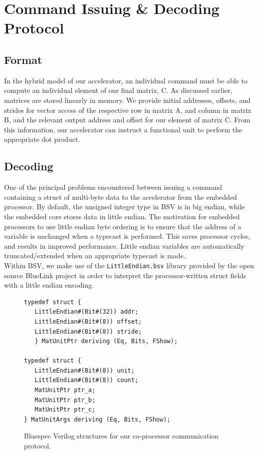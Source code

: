 \documentclass[a4paper,8pt]{report}
\begin{document}
\section{Command Issuing \& Decoding Protocol}
\subsection{Format}
In the hybrid model of our accelerator, an individual command must be able to
compute an individual element of our final matrix, C. As discussed earlier,
matrices are stored linearly in memory. We provide initial addresses, offsets,
and strides for vector access of the respective row in matrix A, and column in
matrix B, and the relevant output address and offset for our element of matrix
C. From this information, our accelerator can instruct a functional unit to
perform the appropriate dot product.

\subsection{Decoding}
One of the principal problems encountered between issuing a command containing
a struct of multi-byte data to the accelerator from the embedded processor. By
default, the unsigned integer type in BSV is in big endian, while the
embedded core stores data in little endian. The motivation for embedded
processors to use little endian byte ordering is to ensure that the address of a
variable is unchanged when a typecast is performed. This saves processor cycles,
and results in improved performance. Little endian variables are automatically
truncated/extended when an appropriate typecast is made. \\


Within BSV, we make use of the \texttt{LittleEndian.bsv} library provided by the
open source BlueLink project in order to interpret the processor-written struct
fields with a little endian encoding.

\begin{figure}[h]
\centering 
\scriptsize
\begin{BVerbatim}
typedef struct {
   LittleEndian#(Bit#(32)) addr;
   LittleEndian#(Bit#(8)) offset;
   LittleEndian#(Bit#(8)) stride;
   } MatUnitPtr deriving (Eq, Bits, FShow);

typedef struct {
   LittleEndian#(Bit#(8)) unit;
   LittleEndian#(Bit#(8)) count;
   MatUnitPtr ptr_a;
   MatUnitPtr ptr_b;
   MatUnitPtr ptr_c;
} MatUnitArgs deriving (Eq, Bits, FShow);

\end{BVerbatim}
\normalsize
\caption{Bluespec Verilog structures for our co-processor communication
  protocol. }
\end{figure}
\end{document}
